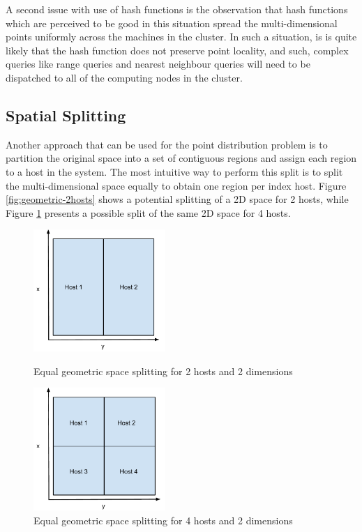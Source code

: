 \documentclass[11pt,a4paper]{globis-book}
\begin{document}
A second issue with use of hash functions is the observation that hash functions which are perceived to be good in this situation spread the multi-dimensional points uniformly across the machines in the cluster. In such a situation, is is quite likely that the hash function does not preserve point locality, and such, complex queries like range queries and nearest neighbour queries will need to be dispatched to all of the computing nodes in the cluster. 

\subsection{Spatial Splitting}

Another approach that can be used for the point distribution problem is to partition the original space into a set of contiguous regions and assign each region to a host in the system. The most intuitive way to perform this split is to split the multi-dimensional space equally to obtain one region per index host. Figure \ref{fig:geometric-2hosts} shows a potential splitting of a 2D space for 2 hosts, while Figure \ref{fig:geometric-4hosts} presents a possible split of the same 2D space for 4 hosts. 

\begin{figure}[h]
\centering
\parbox{5cm}{
    \includegraphics[width=5cm]{images/geometric-2hosts}
    \caption{Equal geometric space splitting for 2 hosts and 2 dimensions}
    \label{fig:geometric-2hosts}}
\qquad
\begin{minipage}{5cm}
    \includegraphics[width=5cm]{images/geometric-4hosts}
    \caption{Equal geometric space splitting for 4 hosts and 2 dimensions}
    \label{fig:geometric-4hosts}
\end{minipage}
\end{figure}
\end{document}
